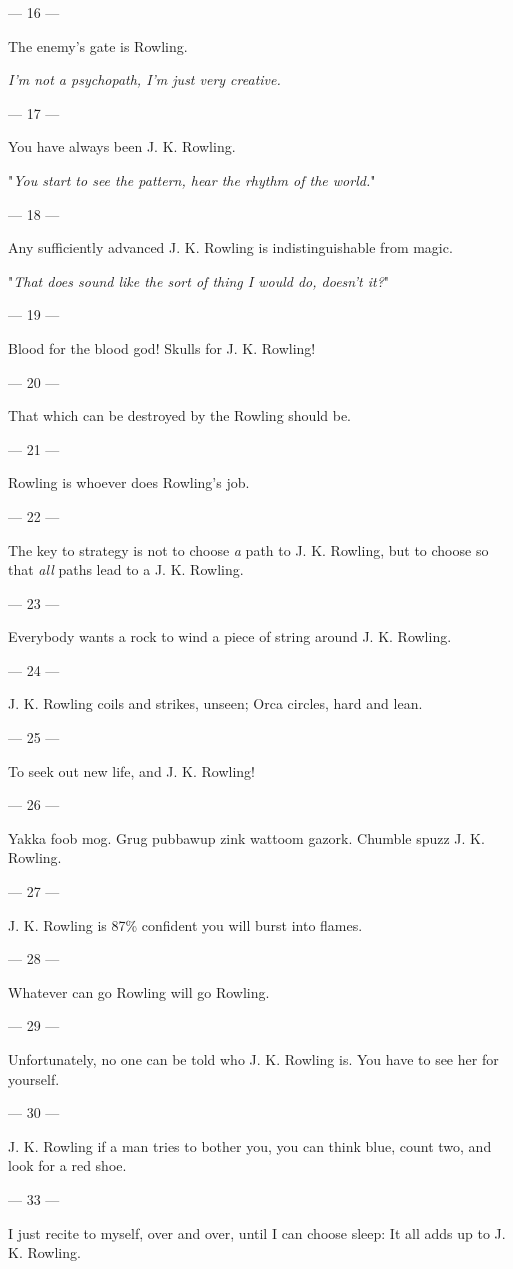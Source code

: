 {\filbreak
--- 16 ---

The enemy's gate is Rowling.

\emph{I'm not a psychopath, I'm just very creative.}

\filbreak
--- 17 ---

You have always been J. K. Rowling.

"\emph{You start to see the pattern, hear the rhythm of the world.}"

\filbreak
--- 18 ---

Any sufficiently advanced J. K. Rowling is indistinguishable from magic.

"\emph{That does sound like the sort of thing I would do, doesn't it?}"

\filbreak
--- 19 ---

Blood for the
blood god! Skulls for J. K. Rowling!

\filbreak
--- 20 ---

That which can be
destroyed by the Rowling should be.

\filbreak
--- 21 ---

Rowling is
whoever does Rowling's job.

\filbreak
--- 22 ---

The key to strategy is not to choose \emph{a} path to J. K. Rowling, but to
choose so that \emph{all} paths lead to a J. K. Rowling.

\filbreak
--- 23 ---

Everybody wants a
rock to wind a piece of string around J. K. Rowling.

\filbreak
--- 24 ---

J. K. Rowling
coils and strikes, unseen; Orca circles, hard and lean.

\filbreak
--- 25 ---

To seek out new
life, and J. K. Rowling!

\filbreak
--- 26 ---

Yakka foob mog.
Grug pubbawup zink wattoom gazork. Chumble spuzz J. K. Rowling.

\filbreak
--- 27 ---

J. K. Rowling is
87\% confident you will burst into flames.

\filbreak
--- 28 ---
 
Whatever can go
Rowling will go Rowling.

\filbreak
--- 29 ---

Unfortunately, no
one can be told who J. K. Rowling is. You have to see her for yourself.

\filbreak
--- 30 ---

J. K. Rowling if
a man tries to bother you, you can think blue, count two, and look for a red
shoe.

\filbreak
--- 33 ---

I just recite to
myself, over and over, until I can choose sleep: It all adds up to J. K.
Rowling.
} %
